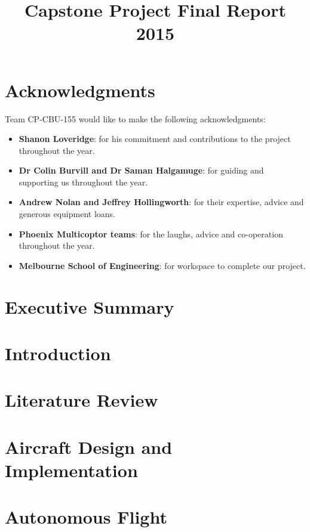 \documentclass{article}
\title{Capstone Project
	  \vfill
	Final Report
	\vfill
	2015}
\author{}
\date{}
\begin{document}
	


\newpage

\section*{Acknowledgments}
Team CP-CBU-155 would like to make the following acknowledgments:
\begin{itemize}
	\item \textbf{Shanon Loveridge}: for his commitment and contributions to the project throughout the year.
	\item \textbf{Dr Colin Burvill and Dr Saman Halgamuge}: for guiding and supporting us throughout the year.
	\item \textbf{Andrew Nolan and Jeffrey Hollingworth}: for their expertise, advice and generous equipment loans.
	\item \textbf{Phoenix Multicoptor teams}: for the laughs, advice and co-operation throughout the year.
	\item \textbf{Melbourne School of Engineering}: for workspace to complete our project.
\end{itemize}



\newpage

\section{Executive Summary}


\newpage

\section{Introduction}


\section{Literature Review}


\section{Aircraft Design and Implementation}


\section{Autonomous Flight}

\end{document}
